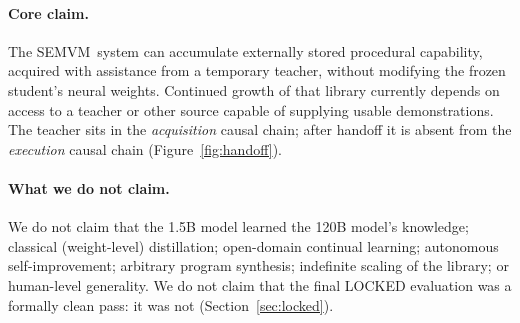 \documentclass[10pt]{article}
\newcommand{\semvm}{SEMVM}
\begin{document}
\paragraph{Core claim.} The \semvm\ system can accumulate externally stored procedural capability, acquired with assistance from a temporary teacher, without modifying the frozen student's neural weights. Continued growth of that library currently depends on access to a teacher or other source capable of supplying usable demonstrations. The teacher sits in the \emph{acquisition} causal chain; after handoff it is absent from the \emph{execution} causal chain (Figure~\ref{fig:handoff}).

\paragraph{What we do not claim.} We do not claim that the 1.5B model learned the 120B model's knowledge; classical (weight-level) distillation; open-domain continual learning; autonomous self-improvement; arbitrary program synthesis; indefinite scaling of the library; or human-level generality. We do not claim that the final LOCKED evaluation was a formally clean pass: it was not (Section~\ref{sec:locked}).
\end{document}
